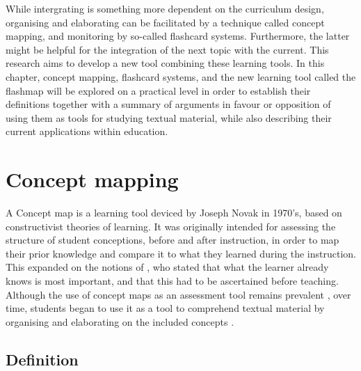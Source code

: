While intergrating is something more dependent on the curriculum design, organising and elaborating can be facilitated by a technique called concept mapping, and monitoring by so-called flashcard systems. Furthermore, the latter might be helpful for the integration of the next topic with the current. This research aims to develop a new tool combining these learning tools. In this chapter, concept mapping, flashcard systems, and the new learning tool called the flashmap will be explored on a practical level in order to establish their definitions together with a summary of arguments in favour or opposition of using them as tools for studying textual material, while also describing their current applications within education.

\section{Concept mapping}

A Concept map is a learning tool deviced by Joseph Novak in 1970's, based on constructivist theories of learning. It was originally intended for assessing the structure of student conceptions, before and after instruction, in order to map their prior knowledge and compare it to what they learned during the instruction. This expanded on the notions of , who stated that what the learner already knows is most important, and that this had to be ascertained before teaching. Although the use of concept maps as an assessment tool remains prevalent \cite{canas, chung, hwang2, ruiz1}, over time, students began to use it as a tool to comprehend textual material by organising and elaborating on the included concepts \cite{canas, eppler, hwang2, karpicke2, nesbit2}.

\subsection{Definition}

